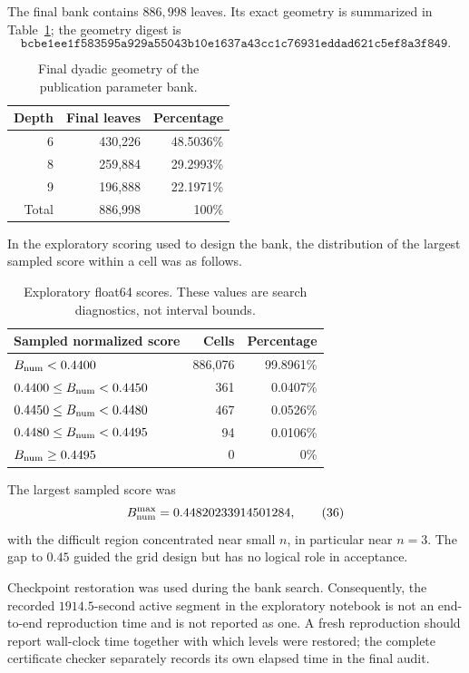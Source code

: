 \documentclass[11pt,a4paper,twoside]{article}
\newcommand{\manualtag}[1]{\tag{#1}}
\theoremstyle{remark}
\newcommand{\code}[1]{\texttt{#1}}
\begin{document}
The final bank contains \(886{,}998\) leaves.  Its exact geometry is
summarized in Table~\ref{tab:bank-depth}; the geometry digest is
\[
 \code{bcbe1ee1f583595a929a55043b10e1637a43cc1c76931eddad621c5ef8a3f849}.
\]

\begin{table}[htbp]
\centering
\caption{Final dyadic geometry of the publication parameter bank.}
\label{tab:bank-depth}
\begin{tabular}{@{}rrr@{}}
\toprule
Depth & Final leaves & Percentage\\
\midrule
6 & 430,226 & 48.5036\%\\
8 & 259,884 & 29.2993\%\\
9 & 196,888 & 22.1971\%\\
\midrule
Total & 886,998 & 100\%\\
\bottomrule
\end{tabular}
\end{table}

In the exploratory scoring used to design the bank, the distribution of the
largest sampled score within a cell was as follows.

\begin{table}[htbp]
\centering
\caption{Exploratory float64 scores.  These values are search diagnostics,
not interval bounds.}
\label{tab:exploratory-scores}
\begin{tabular}{@{}lrr@{}}
\toprule
Sampled normalized score & Cells & Percentage\\
\midrule
\(B_{\rm num}<0.4400\) & 886,076 & 99.8961\%\\
\(0.4400\le B_{\rm num}<0.4450\) & 361 & 0.0407\%\\
\(0.4450\le B_{\rm num}<0.4480\) & 467 & 0.0526\%\\
\(0.4480\le B_{\rm num}<0.4495\) & 94 & 0.0106\%\\
\(B_{\rm num}\ge0.4495\) & 0 & 0\%\\
\bottomrule
\end{tabular}
\end{table}

The largest sampled score was
\begin{equation}
 B_{\rm num}^{\max}=0.44820233914501284,
 \manualtag{36}\label{eq:exploratory-maximum}
\end{equation}
with the difficult region concentrated near small \(n\), in particular near
\(n=3\).  The gap to \(0.45\) guided the grid design but has no logical role
in acceptance.

Checkpoint restoration was used during the bank search.  Consequently, the
recorded \(1914.5\)-second active segment in the exploratory notebook is not
an end-to-end reproduction time and is not reported as one.  A fresh
reproduction should report wall-clock time together with which levels were
restored; the complete certificate checker separately records its own elapsed
time in the final audit.
\end{document}

